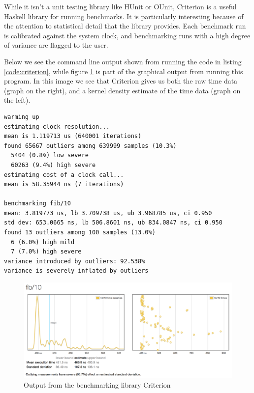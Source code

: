 While it isn't a unit testing library like HUnit or OUnit, Criterion
\cite{www:criterion} is a useful Haskell library for running
benchmarks. It is particularly interesting because of the attention to
statistical detail that the library provides. Each benchmark run is
calibrated against the system clock, and benchmarking runs with a high
degree of variance are flagged to the user.



Below we see the command line output shown from running the code in
listing \ref{code:criterion}, while figure \ref{fig:criterion} is part
of the graphical output from running this program. In this image we
see that Criterion gives us both the raw time data (graph on the
right), and a kernel density estimate of the time data (graph on the
left).

\footnotesize
\begin{verbatim}
warming up
estimating clock resolution...
mean is 1.119713 us (640001 iterations)
found 65667 outliers among 639999 samples (10.3%)
  5404 (0.8%) low severe
  60263 (9.4%) high severe
estimating cost of a clock call...
mean is 58.35944 ns (7 iterations)

benchmarking fib/10
mean: 3.819773 us, lb 3.709738 us, ub 3.968785 us, ci 0.950
std dev: 653.0665 ns, lb 506.8601 ns, ub 834.0847 ns, ci 0.950
found 13 outliers among 100 samples (13.0%)
  6 (6.0%) high mild
  7 (7.0%) high severe
variance introduced by outliers: 92.538%
variance is severely inflated by outliers
\end{verbatim}
\normalsize

\begin{figure}
  \centering
  \includegraphics[scale=0.45]{img/criterion.png}
  \caption[Criterion Output]{Output from the benchmarking library Criterion}
  \label{fig:criterion}
\end{figure}

